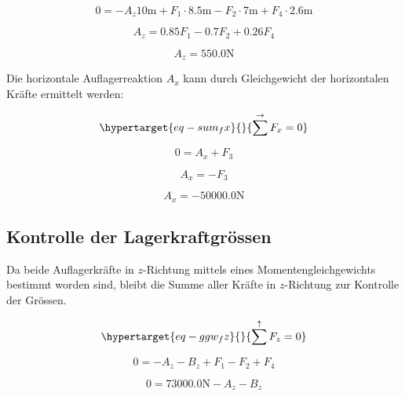 \documentclass[
  12pt,
  letterpaper,
  DIV=11,
  egregdoesnotlikesansseriftitles]{scrartcl}
\begin{document}
\begin{equation}0 = - A_{z} 10 \text{m} + F_{1} \cdot 8.5 \text{m} - F_{2} \cdot 7 \text{m} + F_{4} \cdot 2.6 \text{m}\end{equation}

\begin{equation}A_{z} = 0.85 F_{1} - 0.7 F_{2} + 0.26 F_{4}\end{equation}

\begin{equation}A_{z} = 550.0 \text{N}\end{equation}

Die horizontale Auflagerreaktion \(A_x\) kann durch Gleichgewicht der
horizontalen Kräfte ermittelt werden:

\begin{equation}\protect\hypertarget{eq-sum_fx}{}{
\sum^\rightarrow F_x = 0
}\label{eq-sum_fx}\end{equation}

\begin{equation}0 = A_{x} + F_{3}\end{equation}

\begin{equation}A_{x} = - F_{3}\end{equation}

\begin{equation}A_{x} = - 50000.0 \text{N}\end{equation}

\hypertarget{kontrolle-der-lagerkraftgruxf6ssen}{%
\subsection{Kontrolle der
Lagerkraftgrössen}\label{kontrolle-der-lagerkraftgruxf6ssen}}

Da beide Auflagerkräfte in \(z\)-Richtung mittels eines
Momentengleichgewichts bestimmt worden sind, bleibt die Summe aller
Kräfte in \(z\)-Richtung zur Kontrolle der Grössen.

\begin{equation}\protect\hypertarget{eq-ggw_fz}{}{
\sum^\uparrow F_z = 0
}\label{eq-ggw_fz}\end{equation}

\begin{equation}0 = - A_{z} - B_{z} + F_{1} - F_{2} + F_{4}\end{equation}

\begin{equation}0 = 73000.0 \text{N} - A_{z} - B_{z}\end{equation}
\end{document}
